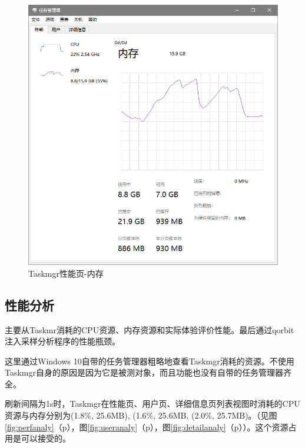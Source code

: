 \documentclass[UTF8,twoside,titlepage]{ctexart}
\newcommand\myref[1]{\ref{#1}（p\pageref{#1}）}
\begin{document}
\begin{landscape}
\begin{multicols}{2}
\begin{figure}[H]
    \centering
    \includegraphics[scale=0.6]{../media/comparison/mgr perfTab mem.png}
    \caption{Taskmgr性能页-内存}
    \label{fig:mgrmem}
\end{figure}

\end{multicols}

\vfill
\hspace{0pt}
\end{landscape}

\subsection{性能分析}
主要从Taskmr消耗的CPU资源、内存资源和实际体验评价性能。最后通过qorbit注入采样分析程序的性能瓶颈。

这里通过Windows 10自带的任务管理器粗略地查看Taskmgr消耗的资源。不使用Taskmgr自身的原因是因为它是被测对象，而且功能也没有自带的任务管理器齐全。

刷新间隔为1s时，Taskmgr在性能页、用户页、详细信息页列表视图时消耗的CPU资源与内存分别为(1.8\%, 25.6MB), (1.6\%, 25.6MB, (2.0\%, 25.7MB)。（见图\myref{fig:perfanaly}，图\myref{fig:useranaly}，图\myref{fig:detailanaly}）。这个资源占用是可以接受的。
\end{document}
